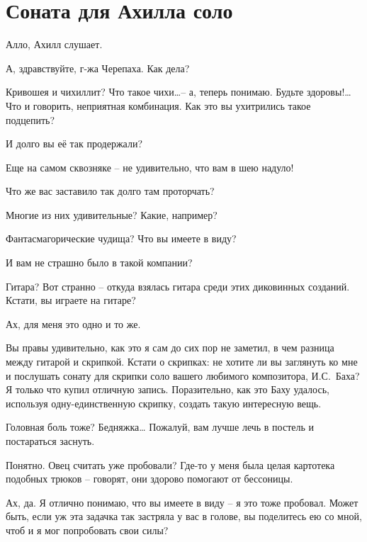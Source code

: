 \documentclass[../main.tex]{subfiles}
\begin{document}
\section{Соната для Ахилла соло}


\begin{Dialogue}

 Алло, Ахилл слушает.

 А, здравствуйте, г-жа Черепаха. Как дела?

 Кривошея и чихиллит? Что такое чихи\ldots \--- а, теперь понимаю. Будьте здоровы!\ldots{} Что и говорить, неприятная комбинация. Как это вы ухитрились такое подцепить?

 И долго вы её так продержали?

 Еще на самом сквозняке \--- не удивительно, что вам в шею надуло!

 Что же вас заставило так долго там проторчать?

 Многие из них удивительные? Какие, например?

 Фантасмагорические чудища? Что вы имеете в виду?

 И вам не страшно было в такой компании?

 Гитара? Вот странно \--- откуда взялась гитара среди этих диковинных созданий. Кстати, вы играете на гитаре?

 Ах, для меня это одно и то же.

 Вы правы удивительно, как это я сам до сих пор не заметил, в чем разница между гитарой и скрипкой. Кстати о скрипках: не хотите ли вы заглянуть ко мне и послушать сонату для скрипки соло вашего любимого композитора, И.С.~Баха? Я только что купил отличную запись. Поразительно, как это Баху удалось, используя одну-единственную скрипку, создать такую интересную вещь.

 Головная боль тоже? Бедняжка\ldots{} Пожалуй, вам лучше лечь в постель и постараться заснуть.

 Понятно. Овец считать уже пробовали? Где-то у меня была целая картотека подобных трюков \--- говорят, они здорово помогают от бессоницы.

 Ах, да. Я отлично понимаю, что вы имеете в виду \--- я это тоже пробовал. Может быть, если уж эта задачка так застряла у вас в голове, вы поделитесь ею со мной, чтоб и я мог попробовать свои силы?


\end{Dialogue}
\end{document}
